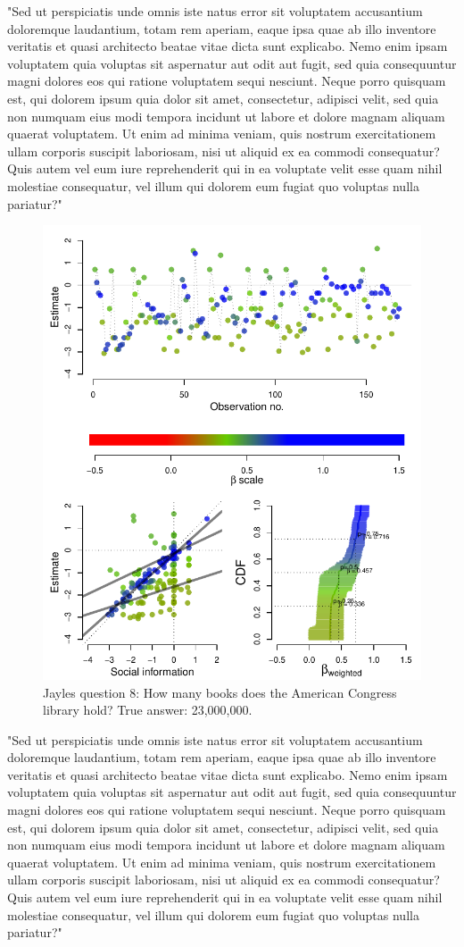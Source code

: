 \documentclass[9pt,twoside,lineno]{pnas-new}
\begin{document}
"Sed ut perspiciatis unde omnis iste natus error sit voluptatem accusantium doloremque laudantium, totam rem aperiam, eaque ipsa quae ab illo inventore veritatis et quasi architecto beatae vitae dicta sunt explicabo. Nemo enim ipsam voluptatem quia voluptas sit aspernatur aut odit aut fugit, sed quia consequuntur magni dolores eos qui ratione voluptatem sequi nesciunt. Neque porro quisquam est, qui dolorem ipsum quia dolor sit amet, consectetur, adipisci velit, sed quia non numquam eius modi tempora incidunt ut labore et dolore magnam aliquam quaerat voluptatem. Ut enim ad minima veniam, quis nostrum exercitationem ullam corporis suscipit laboriosam, nisi ut aliquid ex ea commodi consequatur? Quis autem vel eum iure reprehenderit qui in ea voluptate velit esse quam nihil molestiae consequatur, vel illum qui dolorem eum fugiat quo voluptas nulla pariatur?"

\begin{figure}[htbp]
	\centering\includegraphics[width=.5\textwidth]{../plots/jayles8.pdf}
	\caption{Jayles question 8: How many books does the American Congress library hold? True answer: 23,000,000.}\label{fig: Jayles question 8}
\end{figure}

"Sed ut perspiciatis unde omnis iste natus error sit voluptatem accusantium doloremque laudantium, totam rem aperiam, eaque ipsa quae ab illo inventore veritatis et quasi architecto beatae vitae dicta sunt explicabo. Nemo enim ipsam voluptatem quia voluptas sit aspernatur aut odit aut fugit, sed quia consequuntur magni dolores eos qui ratione voluptatem sequi nesciunt. Neque porro quisquam est, qui dolorem ipsum quia dolor sit amet, consectetur, adipisci velit, sed quia non numquam eius modi tempora incidunt ut labore et dolore magnam aliquam quaerat voluptatem. Ut enim ad minima veniam, quis nostrum exercitationem ullam corporis suscipit laboriosam, nisi ut aliquid ex ea commodi consequatur? Quis autem vel eum iure reprehenderit qui in ea voluptate velit esse quam nihil molestiae consequatur, vel illum qui dolorem eum fugiat quo voluptas nulla pariatur?"
\end{document}
